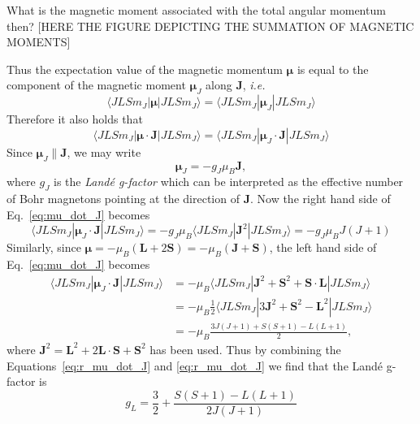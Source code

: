 What is the magnetic moment associated with the total angular momentum then? [HERE THE FIGURE DEPICTING THE SUMMATION OF MAGNETIC MOMENTS]


Thus the expectation value of the magnetic momentum $\boldsymbol{\mu}$ is equal to the component of the magnetic moment $\boldsymbol{\mu}_J$ along $\mathbf{J}$, \emph{i.e.}
\begin{equation}
\langle JLSm_J|\boldsymbol{\mu}|JLSm_J\rangle
= \langle JLSm_J|\boldsymbol{\mu}_J|JLSm_J\rangle
\end{equation}
Therefore it also holds that 
\begin{equation}\label{eq:mu_dot_J}
\langle JLSm_J|\boldsymbol{\mu}\cdot\mathbf{J}|JLSm_J\rangle
= \langle JLSm_J|\boldsymbol{\mu}_J\cdot\mathbf{J}|JLSm_J\rangle
\end{equation}
Since $\boldsymbol{\mu}_J \| \mathbf{J}$, we may write
\begin{equation}
\boldsymbol{\mu}_J = - g_J \mu_B \mathbf{J},
\end{equation}
where $g_J$ is the \emph{Land\'{e} g-factor} which can be interpreted as the effective number of Bohr magnetons pointing at the direction of $\mathbf{J}$. Now the right hand side of Eq.~\eqref{eq:mu_dot_J} becomes
\begin{equation}
\langle JLSm_J|\boldsymbol{\mu}_J\cdot\mathbf{J}|JLSm_J\rangle = - g_J \mu_B \langle JLSm_J|\mathbf{J}^2 |JLSm_J\rangle = - g_J \mu_B J(J+1) \label{eq:r_mu_dot_J}
\end{equation}
Similarly, since $\boldsymbol{\mu} = - \mu_B (\mathbf{L} + 2 \mathbf{S}) = - \mu_B (\mathbf{J} + \mathbf{S})$, the left hand side of Eq.~\eqref{eq:mu_dot_J} becomes
\begin{align}
\langle JLSm_J|\boldsymbol{\mu}_J\cdot\mathbf{J}|JLSm_J\rangle &= - \mu_B \langle JLSm_J|\mathbf{J}^2+\mathbf{S}^2+\mathbf{S}\cdot\mathbf{L}|JLSm_J\rangle
\nonumber \\
&= - \mu_B \frac{1}{2} \langle JLSm_J|3 \mathbf{J}^2+ \mathbf{S}^2-  \mathbf{L}^2|JLSm_J\rangle 
\nonumber \\
&= - \mu_B \frac{3J(J+1)+S(S+1)-L(L+1)}{2}, \label{eq:l_mu_dot_J}
\end{align}
where $\mathbf{J}^2 = \mathbf{L}^2 + 2\mathbf{L} \cdot \mathbf{S} + \mathbf{S}^2$ has been used. Thus by combining the Equations~\eqref{eq:r_mu_dot_J} and \eqref{eq:r_mu_dot_J} we find that the Land\'{e} g-factor is
\begin{equation}
g_L = \frac{3}{2} + \frac{S(S+1)-L(L+1)}{2J(J+1)}
\end{equation}


 
\nocite{ashcroftmermin,blundell_book}


